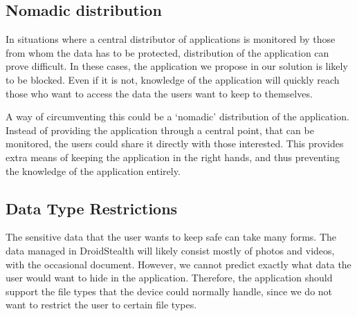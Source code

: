\subsection{Nomadic distribution}
In situations where a central distributor of applications is monitored by those from whom the data has to be protected, distribution of the application can prove difficult.
In these cases, the application we propose in our solution is likely to be blocked.
Even if it is not, knowledge of the application will quickly reach those who want to access the data the users want to keep to themselves.

A way of circumventing this could be a `nomadic' distribution of the application.
Instead of providing the application through a central point, that can be monitored, the users could share it directly with those interested.
This provides extra means of keeping the application in the right hands, and thus preventing the knowledge of the application entirely.  

\subsection{Data Type Restrictions}
The sensitive data that the user wants to keep safe can take many forms.
The data managed in DroidStealth will likely consist mostly of photos and videos, with the occasional document. 
However, we cannot predict exactly what data the user would want to hide in the application.
Therefore, the application should support the file types that the device could normally handle, since we do not want to restrict the user to certain file types.
